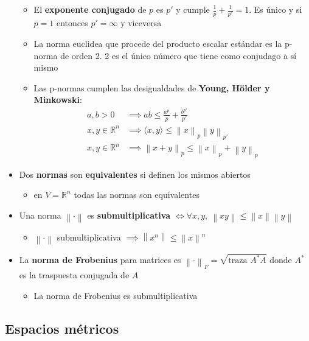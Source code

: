 \documentclass[a4paper,twocolumn]{extarticle}
\newcommand{\R}{\mathbb{R}}
\newcommand{\norma}[1]{\left\lVert#1\right\rVert}
\newcommand{\dotprod}[1]{\langle #1 \rangle}
\newcommand{\tr}{\text{traza }}
\begin{document}
\begin{itemize}
	\begin{itemize}
		\item El \textbf{exponente conjugado} de $p$ es $p'$ y cumple $\frac{1}{p} + \frac{1}{p'} = 1$. Es único y si $p = 1$ entonces $p' = \infty$ y viceversa
		\item La norma euclidea que procede del producto escalar estándar es la p-norma de orden 2. 2 es el único número que tiene como conjudago a sí mismo
		\item Las p-normas cumplen las desigualdades de \textbf{Young, Hölder y Minkowski}:
		\begin{align*}
			a,b > 0 &\implies ab \leq \frac{a^p}{p} + \frac{b^{p'}}{p'} \\
			x,y \in \R^n &\implies \dotprod{x,y} \leq \norma{x}_p \norma{y}_{p'} \\
			x,y \in \R^n &\implies \norma{x+y}_p \leq \norma{x}_p + \norma{y}_p
		\end{align*}
	\end{itemize}
	\item Dos \textbf{normas} son \textbf{equivalentes} si definen los mismos abiertos
	\begin{itemize}
		\item en $V = \R^n$ todas las normas son equivalentes
	\end{itemize}
	\item Una norma $\norma{\cdot}$ es \textbf{submultiplicativa} $\iff \forall x, y,\ \norma{xy} \leq \norma{x}\norma{y}$
	\begin{itemize}
		\item $\norma{\cdot}$ submultiplicativa $\implies \norma{x^n} \leq \norma{x}^n$
	\end{itemize}
	\item La \textbf{norma de Frobenius} para matrices es $\norma{\cdot}_F = \sqrt{\tr A^\ast A}$ donde $A^\ast$ es la traspuesta conjugada de $A$
	\begin{itemize}
		\item La norma de Frobenius es submultiplicativa
	\end{itemize}
\end{itemize}

\subsection{Espacios métricos}
\end{document}
